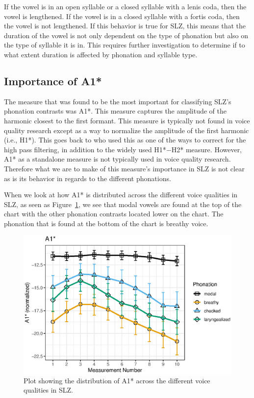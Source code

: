If the vowel is in an open syllable or a closed syllable with a lenis coda, then the vowel is lengthened. If the vowel is in a closed syllable with a fortis coda, then the vowel is not lengthened. If this behavior is true for SLZ, this means that the duration of the vowel is not only dependent on the type of phonation but also on the type of syllable it is in. This requires further investigation to determine if to what extent duration is affected by phonation and syllable type.
\subsection{Importance of A1*} \label{sec:a1_discussion}

The measure that was found to be the most important for classifying SLZ's phonation contrasts was A1*. This measure captures the amplitude of the harmonic closest to the first formant. This measure is typically not found in voice quality research except as a way to normalize the amplitude of the first harmonic (i.e., H1*). This goes back to \citet{fischer-jorgensenPhoneticAnalysisBreathy1968} who used this as one of the ways to correct for the high pass filtering, in addition to the widely used H1*$-$H2* measure. However, A1* as a standalone measure is not typically used in voice quality research. Therefore what we are to make of this measure's importance in SLZ is not clear as is its behavior in regards to the different phonations. 

When we look at how A1* is distributed across the different voice qualities in SLZ, as seen as Figure~\ref{fig:a1}, we see that modal vowels are found at the top of the chart with the other phonation contrasts located lower on the chart. The phonation that is found at the bottom of the chart is breathy voice. 
\begin{figure}[h!]
    \centering
    \includegraphics[width = 0.9\linewidth]{images/slz_a1c.eps}
    \caption{Plot showing the distribution of A1* across the different voice qualities in SLZ.}
    \label{fig:a1}
\end{figure}

